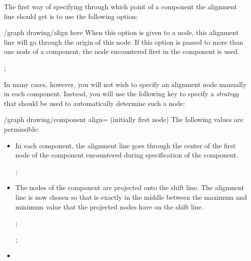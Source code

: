 {The first way of specifying through which point of a component the
alignment line should get is to use the following option:

\begin{key}{/graph drawing/align here}
  When this option is given to a node, this alignment line will go
  through the origin of this node. If this option is passed to more
  than one node of a component, the node encountered first in the
  component is used.
\begin{codeexample}[]
\tikz {};
\end{codeexample}
\end{key}

In many cases, however, you will not wish to specify an alignment node
manually in each component. Instead, you will use the following key to
specify a \emph{strategy} that should be used to automatically
determine such a node:

\begin{key}{/graph drawing/component align= (initially first node)}
  The following values are permissible:
  \begin{itemize}
  \item {}
    In each component, the alignment line goes through the center of
    the first node of the component encountered during specification
    of the component.
\begin{codeexample}[]
\tikz {};
\end{codeexample}
  \item {}
    
    The nodes of the component are projected onto the shift line. The
    alignment line is now chosen so that is exactly in the middle
    between the maximum and minimum value that the projected nodes
    have on the shift line.
\begin{codeexample}[]
\tikz {};
\end{codeexample}
\begin{codeexample}[]
\tikz {};
\end{codeexample}
  \item {}


\end{itemize}
\end{key}}
